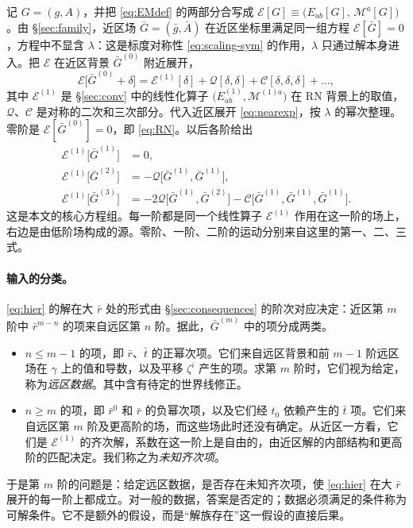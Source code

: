 \documentclass[11pt,a4paper]{ctexart}
\newcommand{\M}{\mathcal M}
\begin{document}
记 $G=(g,A)$，并把 \eqref{eq:EMdef} 的两部分合写成 $\mathcal E[G]\equiv\big(E_{ab}[G],\,\M^a[G]\big)$。由 \S\ref{sec:family}，近区场 $\bar G=(\bar g,\bar A)$ 在近区坐标里满足同一组方程 $\mathcal E[\bar G]=0$，方程中不显含 $\lambda$：这是标度对称性 \eqref{eq:scaling-sym} 的作用，$\lambda$ 只通过解本身进入。把 $\mathcal E$ 在近区背景 $\bar G^{(0)}$ 附近展开，
\begin{equation}
\mathcal E\big[\bar G^{(0)}+\delta\big]=\mathcal E^{(1)}[\delta]+\mathcal Q[\delta,\delta]+\mathcal C[\delta,\delta,\delta]+\dots,
\label{eq:Eexpand}
\end{equation}
其中 $\mathcal E^{(1)}$ 是 \S\ref{sec:conv} 中的线性化算子 $\big(E^{(1)}_{ab},\M^{(1)a}\big)$ 在 RN 背景上的取值，$\mathcal Q$、$\mathcal C$ 是对称的二次和三次部分。代入近区展开 \eqref{eq:nearexp}，按 $\lambda$ 的幂次整理。零阶是 $\mathcal E[\bar G^{(0)}]=0$，即 \eqref{eq:RN}。以后各阶给出
\begin{equation}
\begin{aligned}
\mathcal E^{(1)}\big[\bar G^{(1)}\big]&=0,\\
\mathcal E^{(1)}\big[\bar G^{(2)}\big]&=-\mathcal Q\big[\bar G^{(1)},\bar G^{(1)}\big],\\
\mathcal E^{(1)}\big[\bar G^{(3)}\big]&=-2\mathcal Q\big[\bar G^{(1)},\bar G^{(2)}\big]-\mathcal C\big[\bar G^{(1)},\bar G^{(1)},\bar G^{(1)}\big].
\end{aligned}
\label{eq:hier}
\end{equation}
这是本文的核心方程组。每一阶都是同一个线性算子 $\mathcal E^{(1)}$ 作用在这一阶的场上，右边是由低阶场构成的源。零阶、一阶、二阶的运动分别来自这里的第一、二、三式。

\paragraph{输入的分类。}\eqref{eq:hier} 的解在大 $\bar r$ 处的形式由 \S\ref{sec:consequences} 的阶次对应决定：近区第 $m$ 阶中 $\bar r^{m-n}$ 的项来自远区第 $n$ 阶。据此，$\bar G^{(m)}$ 中的项分成两类。
\begin{itemize}[nosep]
\item $n\le m-1$ 的项，即 $\bar r$、$\bar t$ 的正幂次项。它们来自远区背景和前 $m-1$ 阶远区场在 $\gamma$ 上的值和导数，以及平移 $\zeta^i$ 产生的项。求第 $m$ 阶时，它们视为给定，称为\emph{远区数据}。其中含有待定的世界线修正。
\item $n\ge m$ 的项，即 $\bar r^0$ 和 $\bar r$ 的负幂次项，以及它们经 $t_0$ 依赖产生的 $\bar t$ 项。它们来自远区第 $m$ 阶及更高阶的场，而这些场此时还没有确定。从近区一方看，它们是 $\mathcal E^{(1)}$ 的齐次解，系数在这一阶上是自由的，由近区解的内部结构和更高阶的匹配决定。我们称之为\emph{未知齐次项}。
\end{itemize}
于是第 $m$ 阶的问题是：给定远区数据，是否存在未知齐次项，使 \eqref{eq:hier} 在大 $\bar r$ 展开的每一阶上都成立。对一般的数据，答案是否定的；数据必须满足的条件称为可解条件。它不是额外的假设，而是“解族存在”这一假设的直接后果。
\end{document}

